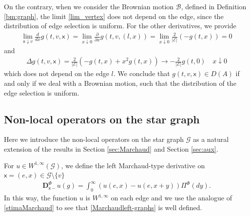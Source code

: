 \documentclass[11pt,a4paper]{article}
\theoremstyle{plain}
\theoremstyle{definition}
\theoremstyle{remark}
\begin{document}
		On the contrary, when we consider the Brownian motion $\mathcal{B}$, defined in Definition \ref{bm:graph}, the limit \eqref{lim_vertex} does not depend on the edge, since the distribution of edge selection is uniform. For the other derivatives, we provide
		\begin{align*}
			\lim_{\mathsf{x}\downarrow v} \frac{d}{dx} g(t,v, \mathsf{x})= \lim_{x \downarrow 0} \frac{\partial}{\partial x}g(t,v,(l,x))=\lim_{x \downarrow 0} \frac{2}{\vert \mathcal{E} \vert} (-g(t,x))=0
		\end{align*}
		and
		\begin{align*}
			\Delta g(t, v, \mathsf{x}) = \frac{2}{\vert \mathcal{E} \vert} (-g(t,x) + x^2 g(t,x)) \rightarrow - \frac{2}{\vert \mathcal{E} \vert} g(t,0) \quad {x \downarrow 0}
		\end{align*}
		which does not depend on the edge $l$. We conclude that $g(t,v,\mathsf{x}) \in D(A)$ if and only if we deal with a Brownian motion, such that the distribution of the edge selection is uniform.
		
		\subsection{Non-local operators on the star graph}
		Here we introduce the non-local operators on the star graph $\mathcal{G}$ as a natural extension of the results in Section \ref{sec:Marchaud} and Section \ref{sec:aux}.
		
		For $u \in W^{1,\infty}(\mathcal{G})$,  we define 
		the left  Marchaud-type derivative  on $\mathsf{x}=(e,x) \in \mathcal{G} \setminus \{v\}$
		\begin{align}
			\label{Marchaudleft-graphs}
			\mathbf{D}_{\mathsf{x}-}^\Phi u(g) = \int_0^\infty (u(e,x) - u(e,x+y))\Pi^\Phi(dy).
		\end{align}
		In this way, the function $u$ is $W^{1,\infty}$ on each edge and we use the analogue of \eqref{stimaMarchaud} to see that  \eqref{Marchaudleft-graphs} is well defined.
		
\end{document}
